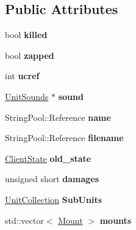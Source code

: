 \subsection*{Public Attributes}
\begin{DoxyCompactItemize}
\item 
bool {\bfseries killed}\hypertarget{classUnit_ac5b6095884475ec876a678b491e56e34}{}\label{classUnit_ac5b6095884475ec876a678b491e56e34}

\item 
bool {\bfseries zapped}\hypertarget{classUnit_abb3954a0f0f19c519ebb1b50708251b4}{}\label{classUnit_abb3954a0f0f19c519ebb1b50708251b4}

\item 
int {\bfseries ucref}\hypertarget{classUnit_a400e98ee8beb7cdf85881035558b821d}{}\label{classUnit_a400e98ee8beb7cdf85881035558b821d}

\item 
\hyperlink{structUnitSounds}{Unit\+Sounds} $\ast$ {\bfseries sound}\hypertarget{classUnit_aff72abfb4dd49b8368797e45a706e381}{}\label{classUnit_aff72abfb4dd49b8368797e45a706e381}

\item 
String\+Pool\+::\+Reference {\bfseries name}\hypertarget{classUnit_a165dcef46b24f348f11d69c8257f89fa}{}\label{classUnit_a165dcef46b24f348f11d69c8257f89fa}

\item 
String\+Pool\+::\+Reference {\bfseries filename}\hypertarget{classUnit_a0b1263495fcb0a4d9b7076f184766303}{}\label{classUnit_a0b1263495fcb0a4d9b7076f184766303}

\item 
\hyperlink{classClientState}{Client\+State} {\bfseries old\+\_\+state}\hypertarget{classUnit_ab183d2e259a81bc1f6a9e4b986b493ce}{}\label{classUnit_ab183d2e259a81bc1f6a9e4b986b493ce}

\item 
unsigned short {\bfseries damages}\hypertarget{classUnit_a8932cbcafb4b0625c45cfb48351df62c}{}\label{classUnit_a8932cbcafb4b0625c45cfb48351df62c}

\item 
\hyperlink{classUnitCollection}{Unit\+Collection} {\bfseries Sub\+Units}\hypertarget{classUnit_a0a3afb2d1c9732c6bac02ef6017d8879}{}\label{classUnit_a0a3afb2d1c9732c6bac02ef6017d8879}

\item 
std\+::vector$<$ \hyperlink{classMount}{Mount} $>$ {\bfseries mounts}\hypertarget{classUnit_a341bb9a9c62f117eca2fde3371e6f152}{}\label{classUnit_a341bb9a9c62f117eca2fde3371e6f152}


\end{DoxyCompactItemize}
